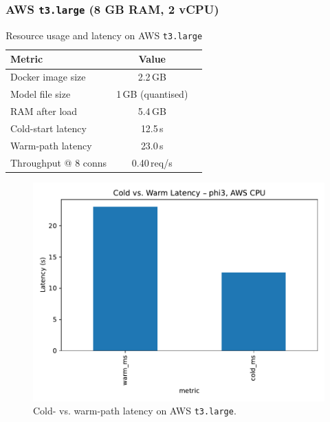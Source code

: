 \documentclass[conference]{IEEEtran}
\begin{document}
\subsubsection*{AWS \texttt{t3.large} (8 GB RAM, 2 vCPU)}

\begin{table}[t]
  \caption{Resource usage and latency on AWS \texttt{t3.large}}
  \label{tab:aws_metrics}
  \centering
  \begin{tabular}{lcc}
    \toprule
      \textbf{Metric} & \textbf{Value} \\
    \midrule
      Docker image size   & 2.2\,GB \\
      Model file size     & 1\,GB (quantised) \\
      RAM after load      & 5.4\,GB \\
      Cold-start latency  & 12.5\,s \\
      Warm-path latency   & 23.0\,s \\
      Throughput @ 8 conns & 0.40\,req/s \\
    \bottomrule
  \end{tabular}
\end{table}

\begin{figure}[t]
  \centering
  \includegraphics[width=\linewidth]{AWSlatency_cold_warm} 
  \caption{Cold- vs. warm-path latency on AWS \texttt{t3.large}.}
  \label{fig:aws_latency}
\end{figure}
\end{document}
